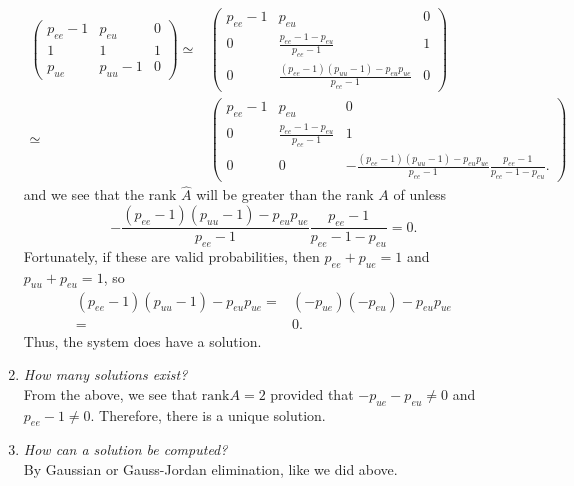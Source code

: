 \documentclass[12pt,reqno]{amsart}
\newcommand{\rank}{\mathrm{rank}}
\theoremstyle{definition}
\begin{document}
\begin{enumerate}
\begin{align*}
  \begin{pmatrix} 
    p_{ee} - 1 & p_{eu} & 0 \\ 
    1 & 1 & 1 \\
    p_{ue} & p_{uu}-1 & 0 
  \end{pmatrix} 
  \simeq & 
  \begin{pmatrix} 
    p_{ee} - 1 & p_{eu} & 0 \\ 
    0 & \frac{p_{ee}- 1 - p_{eu}}{p_{ee}-1}  & 1 \\
    0 & \frac{(p_{ee}-1) (p_{uu}- 1) - p_{eu} p_{ue}}{p_{ee}-1} & 0 
  \end{pmatrix}  \\
  \simeq & 
  \begin{pmatrix} 
    p_{ee} - 1 & p_{eu} & 0 \\ 
    0 & \frac{p_{ee}- 1 - p_{eu}}{p_{ee}-1} &  1 \\
    0 & 0 & -\frac{(p_{ee}-1) (p_{uu}- 1) - p_{eu} p_{ue}}{p_{ee}-1} 
    \frac{p_{ee} - 1}{p_{ee} - 1 - p_{eu}}.
  \end{pmatrix}
\end{align*}
and we see that the rank $\hat{A}$ will be greater than the rank $A$
of unless 
\[ 
   -\frac{(p_{ee}-1) (p_{uu}- 1) - p_{eu} p_{ue}}{p_{ee}-1} 
    \frac{p_{ee} - 1}{p_{ee} - 1 - p_{eu}} = 0 .
\]
Fortunately, if these are valid probabilities, then $p_{ee} + p_{ue} =
1$ and $p_{uu} + p_{eu} = 1$, so 
\begin{align*}
  (p_{ee}-1) (p_{uu}- 1) - p_{eu} p_{ue} = & (-p_{ue})(-p_{eu}) -
  p_{eu} p_{ue} \\
  = & 0.
\end{align*}
Thus, the system does have a solution. 
\item \emph{How many solutions exist?} \\
  From the above, we see that $\rank A = 2$ provided that $-p_{ue} -
  p_{eu} \neq 0$ and $p_{ee} - 1 \neq 0$. Therefore, there is a unique
  solution. 
\item \emph{How can a solution be computed?} \\
  By Gaussian or Gauss-Jordan elimination, like we did above.
\end{enumerate}
\end{document}
